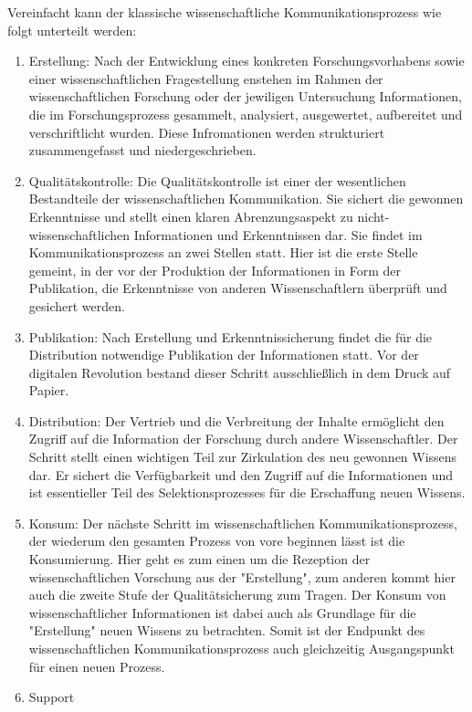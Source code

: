 Vereinfacht kann der klassische wissenschaftliche Kommunikationsprozess\cite{cite:11b} wie folgt unterteilt werden:
\begin{enumerate}
\item Erstellung: 
Nach der Entwicklung eines konkreten Forschungsvorhabens sowie einer wissenschaftlichen Fragestellung enstehen im Rahmen der wissenschaftlichen Forschung oder der jewiligen Untersuchung Informationen\cite{cite:11c}, die im Forschungsprozess gesammelt, analysiert, ausgewertet, aufbereitet und verschriftlicht wurden\cite{cite:11d}. Diese Infromationen werden strukturiert zusammengefasst und niedergeschrieben.\cite{cite:11d}
\item Qualitätskontrolle: 
Die Qualitätskontrolle ist einer der wesentlichen Bestandteile der wissenschaftlichen Kommunikation. Sie sichert die gewonnen Erkenntnisse\cite{cite:11e} und stellt einen klaren Abrenzungsaspekt zu nicht-wissenschaftlichen Informationen und Erkenntnissen dar\cite{cite:11f}. Sie findet im Kommunikationsprozess an zwei Stellen statt. Hier ist die erste Stelle gemeint, in der vor der Produktion der Informationen in Form der Publikation, die Erkenntnisse von anderen Wissenschaftlern überprüft und gesichert werden.\cite{cite:11g}
\item Publikation: 
Nach Erstellung und Erkenntnissicherung findet die für die Distribution notwendige Publikation der Informationen statt. Vor der digitalen Revolution bestand dieser Schritt ausschließlich in dem Druck auf Papier.\cite{cite:11h}
\item Distribution: 
Der Vertrieb und die Verbreitung der Inhalte ermöglicht den Zugriff auf die Information der Forschung durch andere Wissenschaftler. Der Schritt stellt einen wichtigen Teil zur Zirkulation des neu gewonnen Wissens dar\cite{cite:11i}. Er sichert die Verfügbarkeit und den Zugriff auf die Informationen und ist essentieller Teil des Selektionsprozesses für die Erschaffung neuen Wissens.\cite{cite:11l}
\item Konsum: 
Der nächste Schritt im wissenschaftlichen Kommunikationsprozess, der wiederum den gesamten Prozess von vore beginnen lässt ist die Konsumierung. Hier geht es zum einen um die Rezeption der wissenschaftlichen Vorschung aus der "Erstellung", zum anderen kommt hier auch die zweite Stufe der Qualitätsicherung zum Tragen.\cite{cite:11j} Der Konsum von wissenschaftlicher Informationen ist dabei auch als Grundlage für die "Erstellung" neuen Wissens zu betrachten. Somit ist der Endpunkt des wissenschaftlichen Kommunikationsprozess auch gleichzeitig Ausgangspunkt für einen neuen Prozess\cite{cite:11k}.
\item Support
\end{enumerate}
